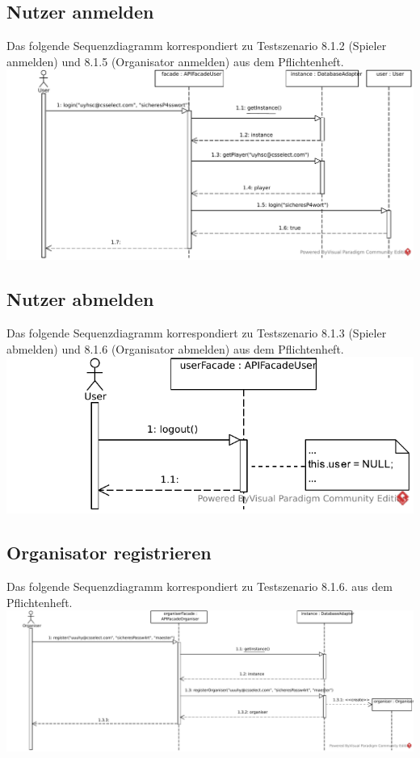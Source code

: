 \documentclass[a4paper]{scrreprt}
\begin{document}
	\subsection{Nutzer anmelden}
	Das folgende Sequenzdiagramm korrespondiert zu Testszenario 8.1.2 (Spieler anmelden) und 8.1.5 (Organisator anmelden) aus dem Pflichtenheft.\\
	\includegraphics[width=\textwidth]{img/SpielerAnmelden.pdf}

	\subsection{Nutzer abmelden}
	Das folgende Sequenzdiagramm korrespondiert zu Testszenario 8.1.3 (Spieler abmelden) und 8.1.6 (Organisator abmelden) aus dem Pflichtenheft. \\
	\includegraphics[width=\textwidth]{img/NutzerAbmelden.pdf}

	\subsection{Organisator registrieren}
	Das folgende Sequenzdiagramm korrespondiert zu Testszenario 8.1.6. aus dem Pflichtenheft. \\
	\includegraphics[width=\textwidth]{img/OrganisatorRegistrieren.pdf}
\end{document}
